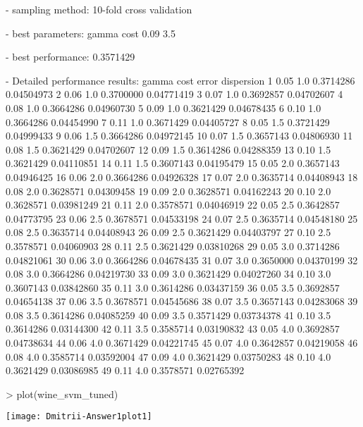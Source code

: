 \documentclass{article}
\begin{document}
\begin{Schunk}
\begin{Soutput}
- sampling method: 10-fold cross validation 

- best parameters:
 gamma cost
  0.09  3.5

- best performance: 0.3571429 

- Detailed performance results:
   gamma cost     error dispersion
1   0.05  1.0 0.3714286 0.04504973
2   0.06  1.0 0.3700000 0.04771419
3   0.07  1.0 0.3692857 0.04702607
4   0.08  1.0 0.3664286 0.04960730
5   0.09  1.0 0.3621429 0.04678435
6   0.10  1.0 0.3664286 0.04454990
7   0.11  1.0 0.3671429 0.04405727
8   0.05  1.5 0.3721429 0.04999433
9   0.06  1.5 0.3664286 0.04972145
10  0.07  1.5 0.3657143 0.04806930
11  0.08  1.5 0.3621429 0.04702607
12  0.09  1.5 0.3614286 0.04288359
13  0.10  1.5 0.3621429 0.04110851
14  0.11  1.5 0.3607143 0.04195479
15  0.05  2.0 0.3657143 0.04946425
16  0.06  2.0 0.3664286 0.04926328
17  0.07  2.0 0.3635714 0.04408943
18  0.08  2.0 0.3628571 0.04309458
19  0.09  2.0 0.3628571 0.04162243
20  0.10  2.0 0.3628571 0.03981249
21  0.11  2.0 0.3578571 0.04046919
22  0.05  2.5 0.3642857 0.04773795
23  0.06  2.5 0.3678571 0.04533198
24  0.07  2.5 0.3635714 0.04548180
25  0.08  2.5 0.3635714 0.04408943
26  0.09  2.5 0.3621429 0.04403797
27  0.10  2.5 0.3578571 0.04060903
28  0.11  2.5 0.3621429 0.03810268
29  0.05  3.0 0.3714286 0.04821061
30  0.06  3.0 0.3664286 0.04678435
31  0.07  3.0 0.3650000 0.04370199
32  0.08  3.0 0.3664286 0.04219730
33  0.09  3.0 0.3621429 0.04027260
34  0.10  3.0 0.3607143 0.03842860
35  0.11  3.0 0.3614286 0.03437159
36  0.05  3.5 0.3692857 0.04654138
37  0.06  3.5 0.3678571 0.04545686
38  0.07  3.5 0.3657143 0.04283068
39  0.08  3.5 0.3614286 0.04085259
40  0.09  3.5 0.3571429 0.03734378
41  0.10  3.5 0.3614286 0.03144300
42  0.11  3.5 0.3585714 0.03190832
43  0.05  4.0 0.3692857 0.04738634
44  0.06  4.0 0.3671429 0.04221745
45  0.07  4.0 0.3642857 0.04219058
46  0.08  4.0 0.3585714 0.03592004
47  0.09  4.0 0.3621429 0.03750283
48  0.10  4.0 0.3621429 0.03086985
49  0.11  4.0 0.3578571 0.02765392
\end{Soutput}
\end{Schunk}
\begin{Schunk}
\begin{Sinput}
> plot(wine_svm_tuned)
\end{Sinput}
\end{Schunk}
\texttt{[image: Dmitrii-Answer1plot1]}
\end{document}
